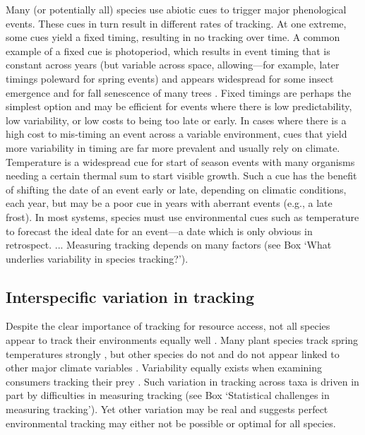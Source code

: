 \documentclass[11pt,letterpaper]{article}
\begin{document}
Many (or potentially all) species use abiotic cues to trigger major phenological events. These cues in turn result in different rates of tracking. At one extreme, some cues yield a fixed timing, resulting in no tracking over time. A common example of a fixed cue is photoperiod, which results in event timing that is constant across years (but variable across space, allowing---for example, later timings poleward for spring events) and appears widespread for some insect emergence and for fall senescence of many trees \citep{Denlinger2017,lechowiczbook2002}. Fixed timings are perhaps the simplest option and may be efficient for events where there is low predictability, low variability, or low costs to being too late or early. In cases where there is a high cost to mis-timing an event across a variable environment, cues that yield more variability in timing are far more prevalent and usually rely on climate. Temperature is a widespread cue for start of season events with many organisms needing a certain thermal sum to start visible growth. Such a cue has the benefit of shifting the date of an event early or late, depending on climatic conditions, each year, but may be a poor cue in years with aberrant events (e.g., a late frost). In most systems, species must use environmental cues such as temperature to forecast the ideal date for an event---a date which is only obvious in retrospect. ...  Measuring tracking depends on many factors (see Box `What underlies variability in species tracking?'). 

 
\subsection{Interspecific variation in tracking}
Despite the clear importance of tracking for resource access, not all species appear to track their environments equally well \citep{thackeray2016}. Many plant species track spring temperatures strongly \citep[multiple meta-analyses now show plants' spring phenology on average track spring or annual temperatures 4-6 days/$\degree$C][and simple temperature models can often explain over 90\% of interannual variation in phenology]{Richardson:2006qh,Wolkovich:2012n,thackeray2016}, but other species do not \citep{Cook:2012pnas} and do not appear linked to other major climate variables \citep{thackeray2016}. Variability equally exists when examining consumers tracking their prey \citep[across diverse species tracking over time is 6.1 days/decade but ranges from zero to 15 days/decade, see][]{kharouba2018}. Such variation in tracking across taxa is driven in part by difficulties in measuring tracking (see Box `Statistical challenges in measuring tracking'). Yet other variation may be real and suggests perfect environmental tracking may either not be possible or optimal for all species. 
\end{document}
